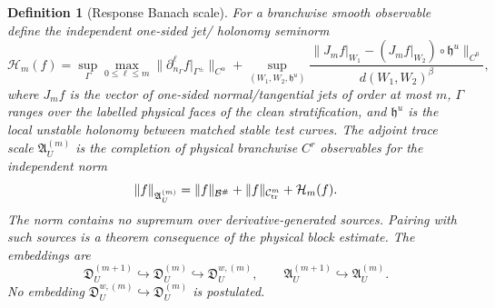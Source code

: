 \documentclass[11pt]{amsart}
\theoremstyle{compactplain}
\theoremstyle{compactdefinition}
\newtheorem{definition}[theorem]{Definition}
\theoremstyle{compactremark}
\newcommand{\Bcal}{\mathcal B}
\begin{document}
\begin{definition}[Response Banach scale]
For a branchwise smooth observable define the independent one-sided jet/
holonomy seminorm
\[
 \mathcal H_m(f)
 =\sup_{\Gamma}\max_{0\le\ell\le m}
   \|\partial_{n_\Gamma}^{\ell}f|_{\Gamma^\pm}\|_{C^\alpha}
 +\sup_{(W_1,W_2,\mathfrak h^u)}
   \frac{\|J_mf|_{W_1}-(J_mf|_{W_2})\circ\mathfrak h^u\|_{C^0}}
        {d(W_1,W_2)^\beta},
\]
where \(J_mf\) is the vector of one-sided normal/tangential jets of order at
most \(m\), \(\Gamma\) ranges over the labelled physical faces of the clean
stratification, and \(\mathfrak h^u\) is the local unstable holonomy between
matched stable test curves.  The adjoint trace scale
\(\mathfrak A_U^{(m)}\) is the completion of physical branchwise \(C^r\)
observables for the independent norm
\begin{equation}
\label{eq:finite_order_observable_scale_norm}
  \|f\|_{\mathfrak A_U^{(m)}}
  =
  \|f\|_{\Bcal^\#}
  +\|f\|_{\mathcal C_{\rm tr}^{m}}
  +\mathcal H_m(f).
\end{equation}
The norm contains no supremum over derivative-generated sources.  Pairing with
such sources is a theorem consequence of the physical block estimate.  The embeddings are
\[
  \mathfrak D_U^{(m+1)}\hookrightarrow\mathfrak D_U^{(m)}
  \hookrightarrow\mathfrak D_U^{w,(m)},\qquad
  \mathfrak A_U^{(m+1)}\hookrightarrow\mathfrak A_U^{(m)}.
\]
No embedding \(\mathfrak D_U^{w,(m)}\hookrightarrow
\mathfrak D_U^{(m)}\) is postulated.
\end{definition}
\end{document}
